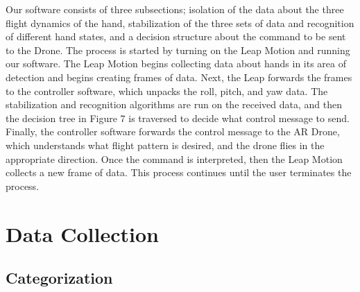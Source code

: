 \documentclass[letterpaper,english, 12pt]{article}
\begin{document}
Our software consists of three subsections; isolation of the data about the three flight dynamics of the hand, stabilization of the three sets of data and recognition of different hand states, and a decision structure about the command to be sent to the Drone. The process is started by turning on the Leap Motion and running our software. The Leap Motion begins collecting data about hands in its area of detection and begins creating frames of data. Next, the Leap forwards the frames to the controller software, which unpacks the roll, pitch, and yaw data. The stabilization and recognition algorithms are run on the received data, and then the decision tree in Figure 7 is traversed to decide what control message to send. Finally, the controller software forwards the control message to the AR Drone, which understands what flight pattern is desired, and the drone flies in the appropriate direction. Once the command is interpreted, then the Leap Motion collects a new frame of data. This process continues until the user terminates the process.

\section*{Data Collection}
\subsection*{Categorization}
\end{document}
